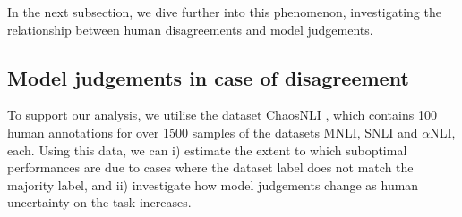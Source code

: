 In the next subsection, we dive further into this phenomenon, investigating the relationship between human disagreements and model judgements.


\subsection{Model judgements in case of disagreement}\label{subsec:chaosnli}

% 
% 

To support our analysis, we utilise the dataset ChaosNLI \citep{nie-etal-2020-learn}, which contains 100 human annotations for over 1500 samples of the datasets MNLI, SNLI and $\alpha$NLI, each.
Using this data, we can i) estimate the extent to which suboptimal performances are due to cases where the dataset label does not match the majority label, and ii) investigate how model judgements change as human uncertainty on the task increases.

